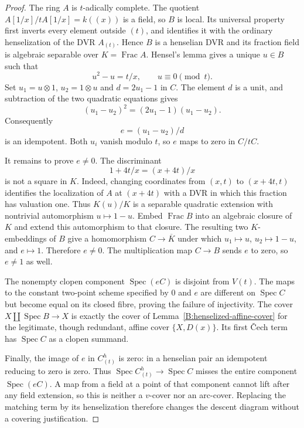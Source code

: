 \begin{proof}
The ring $A$ is $t$-adically complete. The quotient
$A[1/x]/tA[1/x]=k((x))$ is a field, so $B$ is local. Its
universal property first inverts every element outside $(t)$,
and identifies it with the ordinary henselization of the DVR
$A_{(t)}$. Hence $B$ is a henselian DVR and its fraction field
is algebraic separable over $K=\operatorname{Frac}A$.
Hensel's lemma gives a unique $u\in B$ such that
\[
 u^2-u=t/x,\qquad u\equiv0\pmod t.
\]
Set $u_1=u\otimes1$, $u_2=1\otimes u$ and $d=2u_1-1$ in $C$.
The element $d$ is a unit, and subtraction of the two quadratic
equations gives
\[
 (u_1-u_2)^2=(2u_1-1)(u_1-u_2).
\]
Consequently
\[
 e=(u_1-u_2)/d
\]
is an idempotent. Both $u_i$ vanish modulo $t$, so $e$ maps to
zero in $C/tC$.

It remains to prove $e\ne0$. The discriminant
\[
 1+4t/x=(x+4t)/x
\]
is not a square in $K$. Indeed, changing coordinates from
$(x,t)$ to $(x+4t,t)$ identifies the localization of $A$ at
$(x+4t)$ with a DVR in which this fraction has valuation one.
Thus $K(u)/K$ is a separable quadratic extension with
nontrivial automorphism $u\mapsto1-u$. Embed
$\operatorname{Frac}B$ into an algebraic closure of $K$ and
extend this automorphism to that closure. The resulting two
$K$-embeddings of $B$ give a homomorphism $C\to\overline K$
under which $u_1\mapsto u$, $u_2\mapsto1-u$, and $e\mapsto1$.
Therefore $e\ne0$. The multiplication map $C\to B$ sends $e$
to zero, so $e\ne1$ as well.

The nonempty clopen component $\operatorname{Spec}(eC)$ is
disjoint from $V(t)$. The maps to the constant two-point scheme
specified by $0$ and $e$ are different on $\operatorname{Spec}C$
but become equal on its closed fibre, proving the failure of
injectivity. The cover $X\amalg\operatorname{Spec}B\to X$
is exactly the cover of Lemma~\ref{B:henselized-affine-cover}
for the legitimate, though redundant, affine cover
$\{X,D(x)\}$. Its first \v Cech term has
$\operatorname{Spec}C$ as a clopen summand.

Finally, the image of $e$ in $C^h_{(t)}$ is zero: in a henselian
pair an idempotent reducing to zero is zero. Thus
$\operatorname{Spec}C^h_{(t)}\to\operatorname{Spec}C$ misses
the entire component $\operatorname{Spec}(eC)$. A map from a
field at a point of that component cannot lift after any field
extension, so this is neither a $v$-cover nor an arc-cover.
Replacing the matching term by its henselization therefore
changes the descent diagram without a covering justification.
\end{proof}

